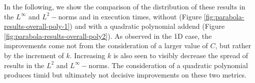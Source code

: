 \documentclass[12pt]{report} %
\begin{document}
In the following, we show the comparison of the distribution of these results in the $L^\infty$ and $L^2-$norms and in execution times, without (Figure \ref{fig:parabola-results-overall-poly-1}) and with a quadratic polynomial addend (Figure \ref{fig:parabola-results-overall-poly2}). As observed in the 1D case, the improvements come not from the consideration of a larger value of $C$, but rather by the increment of $k$. Increasing $k$ is also seen to visibly decrease the spread of results in the $L^2$ and $L^\infty-$norms. The consideration of a quadratic polynomial produces timid but ultimately not decisive improvements on these two metrics. %
\clearpage
\begin{figure}
  \hspace*{-1cm}
  \begin{tabular}{cccccc}

\end{tabular}
\end{figure}
\end{document}
